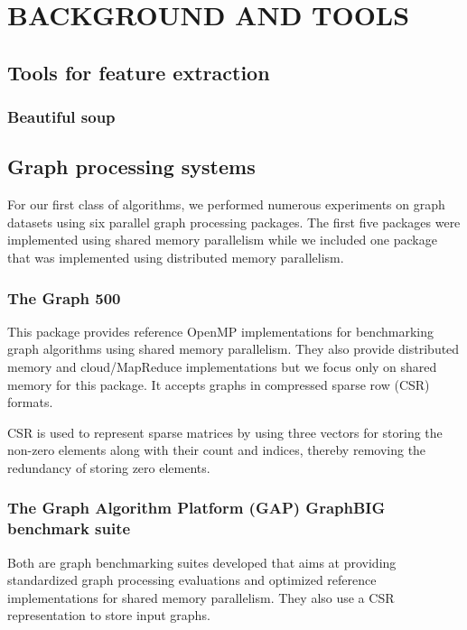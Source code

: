 \chapter{BACKGROUND AND TOOLS } 
\section{Tools for feature extraction}

\subsection{Beautiful soup}
\section{Graph processing systems}
For our first class of algorithms, we performed numerous experiments on graph datasets using six parallel graph processing packages. The first five packages were implemented using shared memory parallelism while we included one package that was implemented using distributed memory parallelism.

\subsection{The Graph 500}
This package provides reference OpenMP implementations for benchmarking graph algorithms using shared memory parallelism. They also provide distributed memory  and cloud/MapReduce implementations but we focus only on shared memory for this package. It accepts graphs in compressed sparse row (CSR) formats. 

CSR is used to represent sparse matrices by using three vectors for storing the non-zero elements along with their count and indices, thereby removing the redundancy of storing zero elements.


\subsection{The Graph Algorithm Platform (GAP) GraphBIG benchmark suite}
Both are graph benchmarking suites developed that aims at providing standardized graph processing evaluations and optimized reference implementations for shared memory parallelism. They also use a CSR representation to store input graphs.

